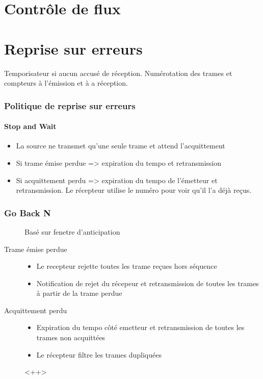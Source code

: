 \documentclass[10pt,a4paper,openany]{book}
\begin{document}
	\setcounter{tocdepth}{2}
	\setcounter{secnumdepth}{3}
	\maketitle
	\tableofcontents
	\chapter{Contrôle de flux}
	\chapter{Reprise sur erreurs}
	Temporisateur si aucun accusé de réception.
	Numérotation des trames et compteurs à l'émission et à a réception. 

	\subsection{Politique de reprise sur erreurs}
	\subsubsection{Stop and Wait}
	\begin{itemize}
		\item La source ne transmet qu'une seule trame et attend l'acquittement
		\item Si trame émise perdue => expiration du tempo et retransmission
		\item Si acquittement perdu => expiration du tempo de l'émetteur et retransmission. Le récepteur utilise le
			numéro pour voir qu'il l'a déjà reçus.
	\end{itemize}
	\subsection{Go Back N}
	\begin{description}
		\item[] Basé sur fenetre d'anticipation
		\item[Trame émise perdue] 
			\begin{itemize}
				\item Le recepteur rejette toutes les trame reçues hors séquence
				\item Notification de rejet du récepeur et retransmission de toutes les trames à partir de la trame
					perdue
			\end{itemize}
		\item[Acquittement perdu] 
			\begin{itemize}
				\item Expiration du tempo côté emetteur et retransmission de toutes les trames non acquittées
				\item Le récepteur filtre les trames dupliquées
			\end{itemize}<++>

	\end{description}
\end{document}
